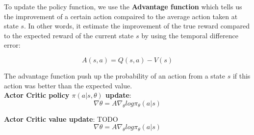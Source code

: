 To update the policy function, we use the \textbf{Advantage function} which tells us the improvement of a certain action compaired to the average action taken at state $s$. 
In other words, it estimate the improvement of the true reward compared to the expected reward of the current state $s$ by using the temporal difference error:

\begin{equation}
	A(s, a) = Q(s, a) - V(s)
\end{equation}

The advantage function push up the probability of an action from a state $s$ if this action was better than the expected value.\\


\textbf{Actor Critic policy $\pi(a | s, \theta)$ update}:
\begin{equation}
	\nabla \theta = A \nabla_\theta log \pi_\theta (a | s)
\end{equation}
	
\textbf{Actor Critic value update}:
TODO
\begin{equation}
	\nabla \theta = A \nabla_\theta log \pi_\theta (a | s)
\end{equation}



		

